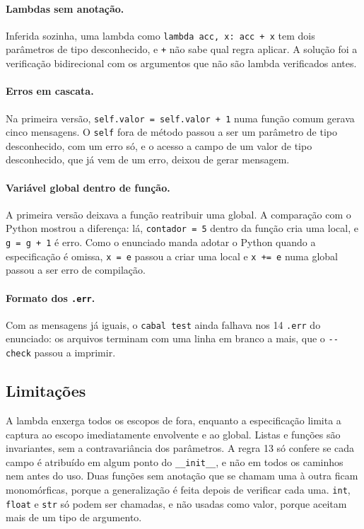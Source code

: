 \documentclass[12pt,a4paper]{article}
\begin{document}
\paragraph{Lambdas sem anotação.} Inferida sozinha, uma lambda como
\texttt{lambda acc, x: acc + x} tem dois parâmetros de tipo
desconhecido, e \texttt{+} não sabe qual regra aplicar. A solução foi a
verificação bidirecional com os argumentos que não são lambda
verificados antes.

\paragraph{Erros em cascata.} Na primeira versão,
\texttt{self.valor = self.valor + 1} numa função comum gerava cinco
mensagens. O \texttt{self} fora de método passou a ser um parâmetro de
tipo desconhecido, com um erro só, e o acesso a campo de um valor de
tipo desconhecido, que já vem de um erro, deixou de gerar mensagem.

\paragraph{Variável global dentro de função.} A primeira versão deixava
a função reatribuir uma global. A comparação com o Python mostrou a
diferença: lá, \texttt{contador = 5} dentro da função cria uma local, e
\texttt{g = g + 1} é erro. Como o enunciado manda adotar o Python
quando a especificação é omissa, \texttt{x = e} passou a criar uma
local e \texttt{x += e} numa global passou a ser erro de compilação.

\paragraph{Formato dos \texttt{.err}.} Com as mensagens já iguais, o
\texttt{cabal test} ainda falhava nos 14 \texttt{.err} do enunciado: os
arquivos terminam com uma linha em branco a mais, que o
\texttt{-{}-check} passou a imprimir.

\subsection{Limitações}

A lambda enxerga todos os escopos de fora, enquanto a especificação
limita a captura ao escopo imediatamente envolvente e ao global. Listas
e funções são invariantes, sem a contravariância dos parâmetros. A
regra 13 só confere se cada campo é atribuído em algum ponto do
\texttt{\_\_init\_\_}, e não em todos os caminhos nem antes do uso.
Duas funções sem anotação que se chamam uma à outra ficam monomórficas,
porque a generalização é feita depois de verificar cada uma.
\texttt{int}, \texttt{float} e \texttt{str} só podem ser chamadas, e não
usadas como valor, porque aceitam mais de um tipo de argumento.
\end{document}
